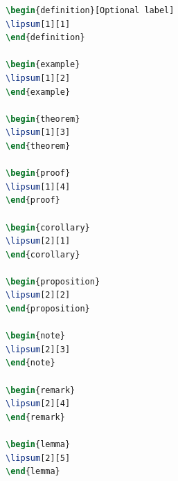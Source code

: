 \begin{lstlisting}[caption={Příklad vložení speciálních číslovaných prostředí},label=list:8-6,captionpos=t,abovecaptionskip=-\medskipamount,belowcaptionskip=\medskipamount,language=TeX]
\begin{definition}[Optional label]
\lipsum[1][1]
\end{definition}

\begin{example}
\lipsum[1][2]
\end{example}

\begin{theorem}
\lipsum[1][3]
\end{theorem}

\begin{proof}
\lipsum[1][4]
\end{proof}

\begin{corollary}
\lipsum[2][1]
\end{corollary}

\begin{proposition}
\lipsum[2][2]
\end{proposition}

\begin{note}
\lipsum[2][3]
\end{note}

\begin{remark}
\lipsum[2][4]
\end{remark}

\begin{lemma}
\lipsum[2][5]
\end{lemma}
\end{lstlisting}

% 
% 
% 
